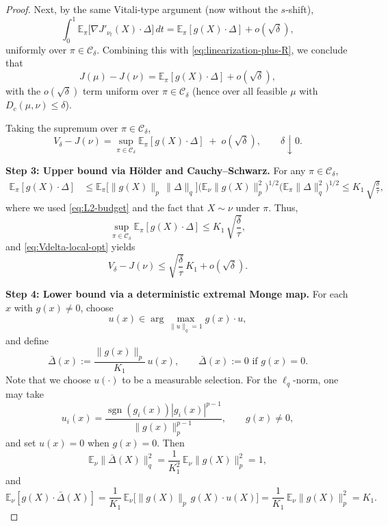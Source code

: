 \documentclass[11pt]{article}
\theoremstyle{definition}
\newcommand{\E}{\mathbb{E}}
\begin{document}
\begin{proof}
Next, by the same Vitali-type argument (now without the $s$-shift),
\[
  \int_0^1 \E_\pi\big[\nabla J'_{\nu_t}(X)\cdot\Delta\big]\,dt
  = \E_\pi[g(X)\cdot\Delta] + o(\sqrt{\delta}),
\]
uniformly over $\pi\in\mathcal{C}_\delta$. Combining this with
\eqref{eq:linearization-plus-R}, we conclude that
\begin{equation}\label{eq:almost-linear}
  J(\mu)-J(\nu)
  = \E_\pi[g(X)\cdot\Delta] + o(\sqrt{\delta}),
\end{equation}
with the $o(\sqrt{\delta})$ term uniform over $\pi\in\mathcal{C}_\delta$ (hence over all
feasible $\mu$ with $D_c(\mu,\nu)\le\delta$).

Taking the supremum over $\pi\in\mathcal{C}_\delta$,
\begin{equation}\label{eq:Vdelta-local-opt}
  V_\delta - J(\nu)
  = \sup_{\pi\in\mathcal{C}_\delta}
      \E_\pi[g(X)\cdot\Delta]
    \;+\; o(\sqrt{\delta}),
  \qquad \delta\downarrow 0.
\end{equation}

\medskip
\noindent\textbf{Step 3: Upper bound via H\"older and Cauchy--Schwarz.}
For any $\pi\in\mathcal{C}_\delta$,
\begin{align*}
  \E_\pi[g(X)\cdot\Delta]
  &\le \E_\pi\big[\|g(X)\|_p\,\|\Delta\|_q\big]\Big(\E_\nu\|g(X)\|_p^2\Big)^{1/2}
       \Big(\E_\pi\|\Delta\|_q^2\Big)^{1/2}\le K_1\,\sqrt{\frac{\delta}{\tau}},
\end{align*}
where we used \eqref{eq:L2-budget} and the fact that $X\sim\nu$ under $\pi$.
Thus,
\[
  \sup_{\pi\in\mathcal{C}_\delta}
    \E_\pi[g(X)\cdot\Delta]
  \le K_1\,\sqrt{\frac{\delta}{\tau}},
\]
and \eqref{eq:Vdelta-local-opt} yields
\[
  V_\delta - J(\nu)
  \le \sqrt{\frac{\delta}{\tau}}\,K_1 + o(\sqrt{\delta}).
\]

\medskip
\noindent\textbf{Step 4: Lower bound via a deterministic extremal Monge map.}
For each $x$ with $g(x)\neq 0$, choose
\[
  u(x) \in \arg\max_{\|u\|_q=1} g(x)\cdot u,
\]
and define
\[
  \bar{\Delta}(x) := \frac{\|g(x)\|_p}{K_1}\,u(x),
  \qquad
  \bar{\Delta}(x) := 0 \text{ if } g(x)=0.
\]
{
Note that we choose \(u(\cdot)\) to be a measurable selection. For the \(\ell_q\)-norm, one may take
\[
u_i(x)
=
\frac{\operatorname{sgn}(g_i(x))|g_i(x)|^{p-1}}
{\|g(x)\|_p^{p-1}},
\qquad g(x)\ne0,
\]
and set \(u(x)=0\) when \(g(x)=0\).
}
Then
\[
  \E_\nu\|\bar{\Delta}(X)\|_q^2
  = \frac{1}{K_1^2}\,\E_\nu\|g(X)\|_p^2 = 1,
\]
and
\[
  \E_\nu[g(X)\cdot\bar{\Delta}(X)]
  = \frac{1}{K_1}\,\E_\nu\big[\|g(X)\|_p\,g(X)\cdot u(X)\big]
  = \frac{1}{K_1}\,\E_\nu\|g(X)\|_p^2 = K_1.
\]


\end{proof}
\end{document}
